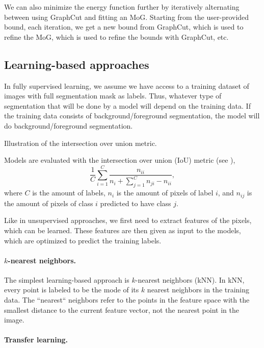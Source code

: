 We can also minimize the energy function further by iteratively alternating
between using GraphCut and fitting an MoG. Starting from the user-provided
bound, each iteration, we get a new bound from GraphCut, which is used to
refine the MoG, which is used to refine the bounds with GraphCut, etc.

\subsection{Learning-based approaches}

In fully supervised learning, we assume we have access to a training dataset
of images with full segmentation mask as labels. Thus, whatever type of
segmentation that will be done by a model will depend on the training data.
If the training data consists of background/foreground segmentation, the
model will do background/foreground segmentation.

\begin{marginfigure}
    \centering
    \caption{Illustration of the intersection over union metric.}
    \label{fig:intersection-over-union-metric}
\end{marginfigure}

Models are evaluated with the intersection over union (IoU) metric (see
), \[
  \frac{1}{C} \sum_{i=1}^C \frac{n_{ii}}{n_i + \sum_{j=1}^C n_{ji} - n_{ii}}
,\]
where $C$ is the amount of labels, $n_i$ is the amount of pixels of label
$i$, and $n_{ij}$ is the amount of pixels of class $i$ predicted to have
class $j$.

Like in unsupervised approaches, we first need to extract features of the
pixels, which can be learned. These features are then given as input to the
models, which are optimized to predict the training labels.

\paragraph{$k$-nearest neighbors.}

The simplest learning-based approach is $k$-nearest neighbors (kNN). In kNN,
every point is labeled to be the mode of its $k$ nearest neighbors in the
training data. The ``nearest`` neighbors refer to the points in the feature
space with the smallest distance to the current feature vector, not the
nearest point in the image.

\paragraph{Transfer learning.}

